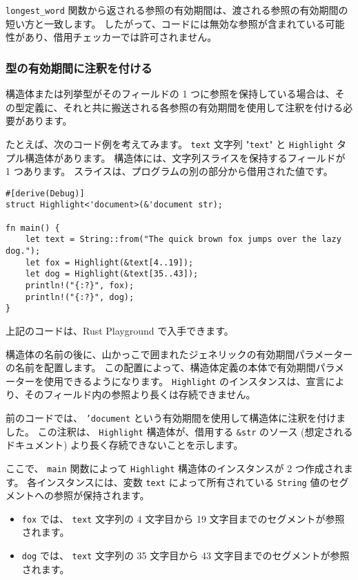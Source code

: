 \texttt{longest\_word} 関数から返される参照の有効期間は、渡される参照の有効期間の短い方と一致します。 したがって、コードには無効な参照が含まれている可能性があり、借用チェッカーでは許可されません。

\subsubsection{型の有効期間に注釈を付ける}

構造体または列挙型がそのフィールドの 1 つに参照を保持している場合は、その型定義に、それと共に搬送される各参照の有効期間を使用して注釈を付ける必要があります。

たとえば、次のコード例を考えてみます。 \texttt{text} 文字列 "\texttt{text}" と \texttt{Highlight} タプル構造体があります。 構造体には、文字列スライスを保持するフィールドが 1 つあります。 スライスは、プログラムの別の部分から借用された値です。

\begin{lstlisting}[numbers=none]
#[derive(Debug)]
struct Highlight<'document>(&'document str);

fn main() {
    let text = String::from("The quick brown fox jumps over the lazy dog.");
    let fox = Highlight(&text[4..19]);
    let dog = Highlight(&text[35..43]);
    println!("{:?}", fox);
    println!("{:?}", dog);
}
\end{lstlisting}

上記のコードは、Rust Playground で入手できます。

構造体の名前の後に、山かっこで囲まれたジェネリックの有効期間パラメーターの名前を配置します。 この配置によって、構造体定義の本体で有効期間パラメーターを使用できるようになります。 \texttt{Highlight} のインスタンスは、宣言により、そのフィールド内の参照より長くは存続できません。

前のコードでは、 \texttt{'document} という有効期間を使用して構造体に注釈を付けました。 この注釈は、 \texttt{Highlight} 構造体が、借用する \texttt{\&str} のソース (想定されるドキュメント) より長く存続できないことを示します。

ここで、 \texttt{main} 関数によって \texttt{Highlight} 構造体のインスタンスが 2 つ作成されます。 各インスタンスには、変数 \texttt{text} によって所有されている \texttt{String} 値のセグメントへの参照が保持されます。

\begin{itemize}
\item \texttt{fox} では、 \texttt{text} 文字列の 4 文字目から 19 文字目までのセグメントが参照されます。
\item \texttt{dog} では、 \texttt{text} 文字列の 35 文字目から 43 文字目までのセグメントが参照されます。
\end{itemize}

